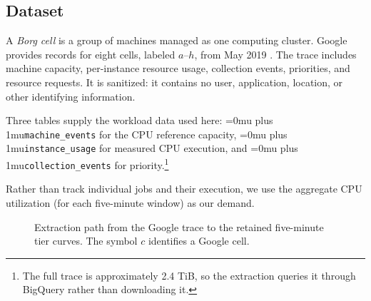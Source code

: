 \documentclass[conference]{IEEEtran}
\newcommand{\codepath}[1]{{\Urlmuskip=0mu plus 1mu\relax\nolinkurl{#1}}}
\begin{document}
\subsection{Dataset}
\label{subsec:clusterdata-role}

A \emph{Borg cell} is a group of machines managed as one computing cluster.
Google provides records for eight cells, labeled \(a\)--\(h\), from May 2019
\cite{wilkes2020clusterdata2019, tirmazi2020borg}. The trace includes machine
capacity, per-instance resource usage, collection events, priorities, and
resource requests. It is sanitized: it contains no user, application,
location, or other identifying information.

Three tables supply the workload data used here: \codepath{machine_events}
for the CPU reference capacity, \codepath{instance_usage} for measured CPU
execution, and \codepath{collection_events} for
priority.\footnote{The full trace is approximately 2.4 TiB, so the extraction
queries it through BigQuery rather than downloading it.}

Rather than track individual jobs and their execution, we use the aggregate CPU utilization (for each five-minute window) as our demand.   

\begin{figure}[!ht]
  \centering
  \caption{Extraction path from the Google trace to the retained five-minute
  tier curves. The symbol \(c\) identifies a Google cell.}
  \label{fig:clusterdata-pipeline}
\end{figure}
\end{document}
